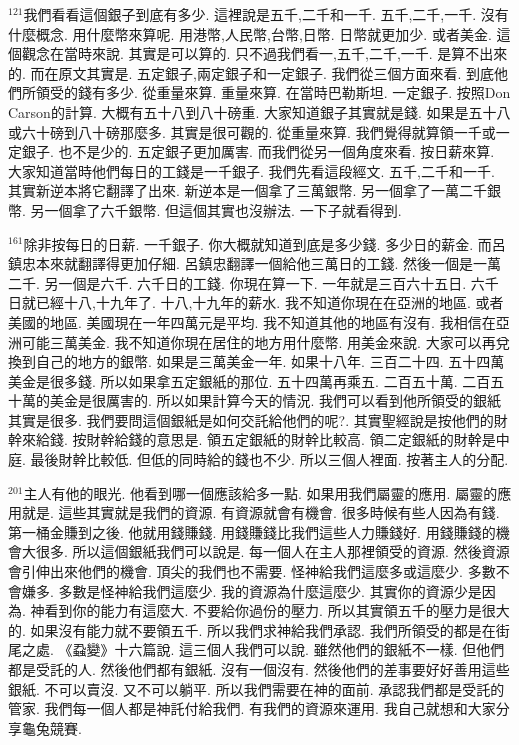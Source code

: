 \documentclass{book}
\begin{document}
$^{121}$我們看看這個銀子到底有多少.
這裡說是五千,二千和一千.
五千,二千,一千.
沒有什麼概念.
用什麼幣來算呢.
用港幣,人民幣,台幣,日幣.
日幣就更加少.
或者美金.
這個觀念在當時來說.
其實是可以算的.
只不過我們看一,五千,二千,一千.
是算不出來的.
而在原文其實是.
五定銀子,兩定銀子和一定銀子.
我們從三個方面來看.
到底他們所領受的錢有多少.
從重量來算.
重量來算.
在當時巴勒斯坦.
一定銀子.
按照Don Carson的計算.
大概有五十八到八十磅重.
大家知道銀子其實就是錢.
如果是五十八或六十磅到八十磅那麼多.
其實是很可觀的.
從重量來算.
我們覺得就算領一千或一定銀子.
也不是少的.
五定銀子更加厲害.
而我們從另一個角度來看.
按日薪來算.
大家知道當時他們每日的工錢是一千銀子.
我們先看這段經文.
五千,二千和一千.
其實新逆本將它翻譯了出來.
新逆本是一個拿了三萬銀幣.
另一個拿了一萬二千銀幣.
另一個拿了六千銀幣.
但這個其實也沒辦法.
一下子就看得到.

$^{161}$除非按每日的日薪.
一千銀子.
你大概就知道到底是多少錢.
多少日的薪金.
而呂鎮忠本來就翻譯得更加仔細.
呂鎮忠翻譯一個給他三萬日的工錢.
然後一個是一萬二千.
另一個是六千.
六千日的工錢.
你現在算一下.
一年就是三百六十五日.
六千日就已經十八,十九年了.
十八,十九年的薪水.
我不知道你現在在亞洲的地區.
或者美國的地區.
美國現在一年四萬元是平均.
我不知道其他的地區有沒有.
我相信在亞洲可能三萬美金.
我不知道你現在居住的地方用什麼幣.
用美金來說.
大家可以再兌換到自己的地方的銀幣.
如果是三萬美金一年.
如果十八年.
三百二十四.
五十四萬美金是很多錢.
所以如果拿五定銀紙的那位.
五十四萬再乘五.
二百五十萬.
二百五十萬的美金是很厲害的.
所以如果計算今天的情況.
我們可以看到他所領受的銀紙其實是很多.
我們要問這個銀紙是如何交託給他們的呢?.
其實聖經說是按他們的財幹來給錢.
按財幹給錢的意思是.
領五定銀紙的財幹比較高.
領二定銀紙的財幹是中庭.
最後財幹比較低.
但低的同時給的錢也不少.
所以三個人裡面.
按著主人的分配.

$^{201}$主人有他的眼光.
他看到哪一個應該給多一點.
如果用我們屬靈的應用.
屬靈的應用就是.
這些其實就是我們的資源.
有資源就會有機會.
很多時候有些人因為有錢.
第一桶金賺到之後.
他就用錢賺錢.
用錢賺錢比我們這些人力賺錢好.
用錢賺錢的機會大很多.
所以這個銀紙我們可以說是.
每一個人在主人那裡領受的資源.
然後資源會引伸出來他們的機會.
頂尖的我們也不需要.
怪神給我們這麼多或這麼少.
多數不會嫌多.
多數是怪神給我們這麼少.
我的資源為什麼這麼少.
其實你的資源少是因為.
神看到你的能力有這麼大.
不要給你過份的壓力.
所以其實領五千的壓力是很大的.
如果沒有能力就不要領五千.
所以我們求神給我們承認.
我們所領受的都是在街尾之處.
《蝨變》十六篇說.
這三個人我們可以說.
雖然他們的銀紙不一樣.
但他們都是受託的人.
然後他們都有銀紙.
沒有一個沒有.
然後他們的差事要好好善用這些銀紙.
不可以賣沒.
又不可以躺平.
所以我們需要在神的面前.
承認我們都是受託的管家.
我們每一個人都是神託付給我們.
有我們的資源來運用.
我自己就想和大家分享龜兔競賽.
\end{document}
